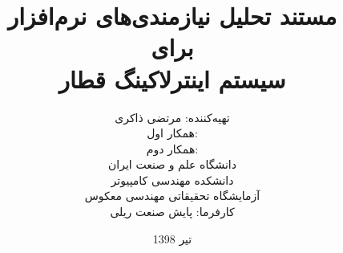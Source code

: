 
\def\Institute{دانشگاه علم و صنعت ایران}
\def\School{دانشکده مهندسی کامپیوتر}
\def\Department{آزمایشگاه تحقیقاتی مهندسی معکوس}

\def\Company{پایش صنعت ریلی}

\def\Course{مهندسی نرم‌افزار}
\def\Module{مستند تحلیل نیازمندی‌ها}
\def\Docent{کارفرما: }

\def\AssistantA{همکار اول:}
\def\AssistantB{همکار دوم:}

\def\BoldTitle{\huge{مستند تحلیل نیازمندی‌های نرم‌افزار}}

\def\Subtitle{برای \\ سیستم اینترلاکینگ قطار \\}

\def\Authors{تهیه‌کننده: مرتضی ذاکری} 

\def\Shortname{مستندات}


\title{\textbf{\BoldTitle}\\\vspace{1cm} \Subtitle}

\author{\Authors\\ \AssistantA\\ \AssistantB\vspace{1cm}\\ \Institute\\ \School\\ \Department\vspace{1cm}\\ \Docent \Company\vspace{1cm}}

\date{تیر 1398}



